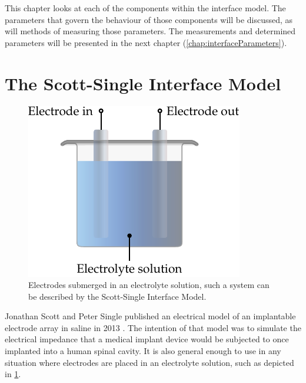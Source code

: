 
This chapter looks at each of the components within the interface model.
The parameters that govern the behaviour of those components will be discussed, as will methods of measuring those parameters.
The measurements and determined parameters will be presented in the next chapter (\cref{chap:interfaceParameters}).


\section{The Scott-Single Interface Model}


  \begin{figure}
    \centering
    \includegraphics{content/pt2/07-InterfaceModel/graphics/electrode-electrolyte}
    \caption{\label{fig:electrode-electrolyte}Electrodes submerged in an electrolyte solution, such a system can be described by the Scott-Single Interface Model.}
  \end{figure}

  Jonathan Scott and Peter Single published an electrical model of an implantable electrode array in saline in 2013 \cite{ScottSingle2013}.
  The intention of that model was to simulate the electrical impedance that a medical implant device would be subjected to once implanted into a human spinal cavity.
  It is also general enough to use in any situation where electrodes are placed in an electrolyte solution, such as depicted in \cref{fig:electrode-electrolyte}.

